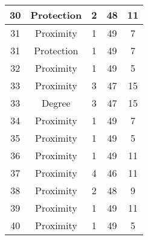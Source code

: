 \documentclass[results.tex]{subfiles}
\begin{document}
\begin{center}
\begin{tabular}{| c || c | c | c | c |}
            \hline
            30                      & Protection                   & 2                      & 48                      & 11                   \\
            \hline
            31                      & Proximity                    & 1                      & 49                      & 7                    \\
            \hline
            31                      & Protection                   & 1                      & 49                      & 7                    \\
            \hline
            32                      & Proximity                    & 1                      & 49                      & 5                    \\
            \hline
            33                      & Proximity                    & 3                      & 47                      & 15                   \\
            \hline
            33                      & Degree                       & 3                      & 47                      & 15                   \\
            \hline
            34                      & Proximity                    & 1                      & 49                      & 7                    \\
            \hline
            35                      & Proximity                    & 1                      & 49                      & 5                    \\
            \hline
            36                      & Proximity                    & 1                      & 49                      & 11                   \\
            \hline
            37                      & Proximity                    & 4                      & 46                      & 11                   \\
            \hline
            38                      & Proximity                    & 2                      & 48                      & 9                    \\
            \hline
            39                      & Proximity                    & 1                      & 49                      & 11                   \\
            \hline
            40                      & Proximity                    & 1                      & 49                      & 5                    \\

\end{tabular}
\end{center}
\end{document}
